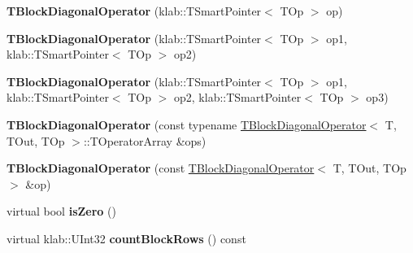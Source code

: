 \begin{DoxyCompactItemize}
\item 
{\bfseries T\+Block\+Diagonal\+Operator} (klab\+::\+T\+Smart\+Pointer$<$ T\+Op $>$ op)\hypertarget{classkl1p_1_1TBlockDiagonalOperator_a5bb117d84b4ab6f24b7ed3d537f32d84}{}\label{classkl1p_1_1TBlockDiagonalOperator_a5bb117d84b4ab6f24b7ed3d537f32d84}

\item 
{\bfseries T\+Block\+Diagonal\+Operator} (klab\+::\+T\+Smart\+Pointer$<$ T\+Op $>$ op1, klab\+::\+T\+Smart\+Pointer$<$ T\+Op $>$ op2)\hypertarget{classkl1p_1_1TBlockDiagonalOperator_a3208a2a7d63f6295e24c9f591f4c8f25}{}\label{classkl1p_1_1TBlockDiagonalOperator_a3208a2a7d63f6295e24c9f591f4c8f25}

\item 
{\bfseries T\+Block\+Diagonal\+Operator} (klab\+::\+T\+Smart\+Pointer$<$ T\+Op $>$ op1, klab\+::\+T\+Smart\+Pointer$<$ T\+Op $>$ op2, klab\+::\+T\+Smart\+Pointer$<$ T\+Op $>$ op3)\hypertarget{classkl1p_1_1TBlockDiagonalOperator_a0a5391de470f2d94b87675c1f9d08dd0}{}\label{classkl1p_1_1TBlockDiagonalOperator_a0a5391de470f2d94b87675c1f9d08dd0}

\item 
{\bfseries T\+Block\+Diagonal\+Operator} (const typename \hyperlink{classkl1p_1_1TBlockDiagonalOperator}{T\+Block\+Diagonal\+Operator}$<$ T, T\+Out, T\+Op $>$\+::T\+Operator\+Array \&ops)\hypertarget{classkl1p_1_1TBlockDiagonalOperator_a51eca6f49e3b9eddcd4cbe98e43bd428}{}\label{classkl1p_1_1TBlockDiagonalOperator_a51eca6f49e3b9eddcd4cbe98e43bd428}

\item 
{\bfseries T\+Block\+Diagonal\+Operator} (const \hyperlink{classkl1p_1_1TBlockDiagonalOperator}{T\+Block\+Diagonal\+Operator}$<$ T, T\+Out, T\+Op $>$ \&op)\hypertarget{classkl1p_1_1TBlockDiagonalOperator_a23f424572fd85f8619931c6ceeadee91}{}\label{classkl1p_1_1TBlockDiagonalOperator_a23f424572fd85f8619931c6ceeadee91}

\item 
virtual bool {\bfseries is\+Zero} ()\hypertarget{classkl1p_1_1TBlockDiagonalOperator_a495a43e99ac028c66cfa43d6a8803173}{}\label{classkl1p_1_1TBlockDiagonalOperator_a495a43e99ac028c66cfa43d6a8803173}

\item 
virtual klab\+::\+U\+Int32 {\bfseries count\+Block\+Rows} () const \hypertarget{classkl1p_1_1TBlockDiagonalOperator_a3c84f36c3292ce2dc96550948e336741}{}\label{classkl1p_1_1TBlockDiagonalOperator_a3c84f36c3292ce2dc96550948e336741}


\end{DoxyCompactItemize}
